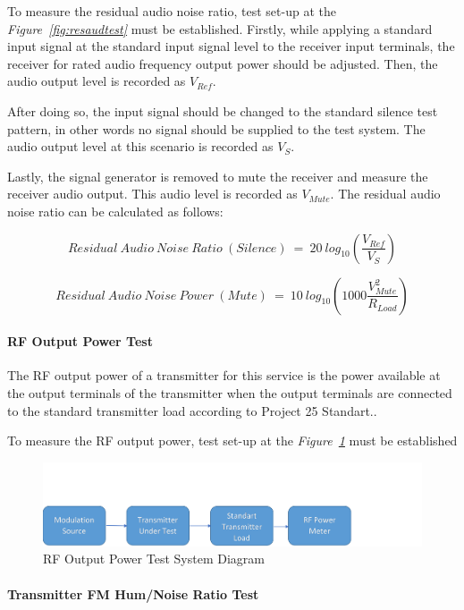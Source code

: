	To measure the residual audio noise ratio, test set-up at the \textit{Figure~\ref{fig:resaudtest}} must be established. Firstly, while applying a standard input signal at the standard input signal level to the receiver input terminals, the receiver for rated audio frequency output power should be adjusted. Then, the audio output level is recorded as $V_{Ref}$.
	
	After doing so, the input signal should be changed to the standard silence test pattern, in other words no signal should be supplied to the test system. The audio output level at this scenario is recorded as $V_{S}$.
	
	Lastly, the signal generator is removed to mute the receiver and measure the receiver audio output. This audio level is recorded as $V_{Mute}$. The residual audio noise ratio can be calculated as follows:
	
$$	Residual~Audio~Noise~Ratio~(Silence)~=~20~log_{10}(\frac{V_{Ref}}{V_{S}}) 	$$

$$	Residual~Audio~Noise~Power~(Mute)~=~10~log_{10}(1000\frac{V^2_{Mute}}{R_{Load}}) 	$$


\paragraph{RF Output Power Test}
\- \indent
	The RF output power of a transmitter for this service is the power available at the output terminals of the transmitter when the output terminals are connected to the standard transmitter load according to Project 25 Standart\cite{P25}..

	To measure the RF output power, test set-up at the \textit{Figure~\ref{fig:rfouttest}} must be established
	
	
\begin{figure}[H]
	\center
	\setlength{\unitlength}{\textwidth} 
	\includegraphics[width=0.75\unitlength]{rfouttest}
	\caption{\label{fig:rfouttest}RF Output Power Test System Diagram }
\end{figure}

\paragraph{Transmitter FM Hum/Noise Ratio Test}
\- \indent


